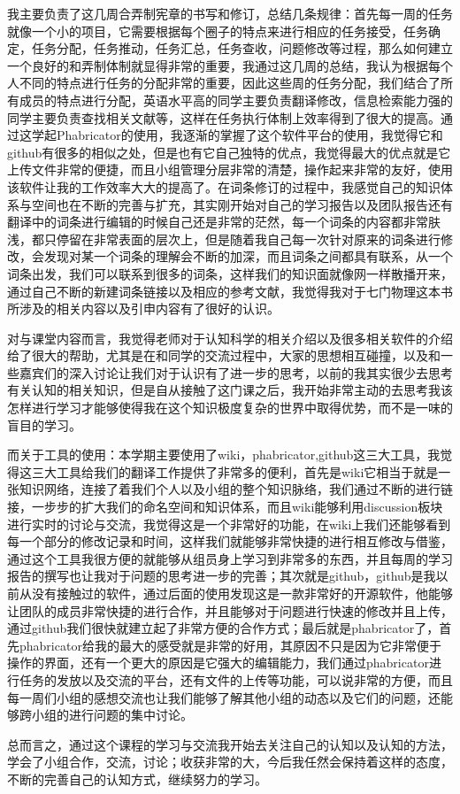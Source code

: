 \documentclass[11pt,fleqn]{book}
\numberwithin{dummy}{section}
\theoremstyle{ocrenumbox}
\theoremstyle{blacknumex}
\theoremstyle{blacknumbox}
\theoremstyle{ocrenum}
\newenvironment{remark}[1]{\par\vspace{10pt}\small %
	\begin{list}{}{
			\leftmargin=35pt %
			\rightmargin=25pt}\item\ignorespaces %
		\makebox[-2.5pt]{\begin{tikzpicture}[overlay]
			\node[draw=ocre!60,line width=1pt,circle,fill=ocre!25,font=\sffamily\bfseries,inner sep=2pt,outer sep=0pt] at (-15pt,0pt){\textcolor{ocre}{#1}};\end{tikzpicture}} %
		\advance\baselineskip -1pt}{\end{list}\vskip5pt} %
\newlength\esp
\begin{document}
\begin{remark}{黄}
	我主要负责了这几周合弄制宪章的书写和修订，总结几条规律：首先每一周的任务就像一个小的项目，它需要根据每个圈子的特点来进行相应的任务接受，任务确定，任务分配，任务推动，任务汇总，任务查收，问题修改等过程，那么如何建立一个良好的和弄制体制就显得非常的重要，我通过这几周的总结，我认为根据每个人不同的特点进行任务的分配非常的重要，因此这些周的任务分配，我们结合了所有成员的特点进行分配，英语水平高的同学主要负责翻译修改，信息检索能力强的同学主要负责查找相关文献等，这样在任务执行体制上效率得到了很大的提高。通过这学起Phabricator的使用，我逐渐的掌握了这个软件平台的使用，我觉得它和github有很多的相似之处，但是也有它自己独特的优点，我觉得最大的优点就是它上传文件非常的便捷，而且小组管理分层非常的清楚，操作起来非常的友好，使用该软件让我的工作效率大大的提高了。在词条修订的过程中，我感觉自己的知识体系与空间也在不断的完善与扩充，其实刚开始对自己的学习报告以及团队报告还有翻译中的词条进行编辑的时候自己还是非常的茫然，每一个词条的内容都非常肤浅，都只停留在非常表面的层次上，但是随着我自己每一次针对原来的词条进行修改，会发现对某一个词条的理解会不断的加深，而且词条之间都具有联系，从一个词条出发，我们可以联系到很多的词条，这样我们的知识面就像网一样散播开来，通过自己不断的新建词条链接以及相应的参考文献，我觉得我对于七门物理这本书所涉及的相关内容以及引申内容有了很好的认识。
     
     对与课堂内容而言，我觉得老师对于认知科学的相关介绍以及很多相关软件的介绍给了很大的帮助，尤其是在和同学的交流过程中，大家的思想相互碰撞，以及和一些嘉宾们的深入讨论让我们对于认识有了进一步的思考，以前的我其实很少去思考有关认知的相关知识，但是自从接触了这门课之后，我开始非常主动的去思考我该怎样进行学习才能够使得我在这个知识极度复杂的世界中取得优势，而不是一味的盲目的学习。
     
     而关于工具的使用：本学期主要使用了wiki，phabricator,github这三大工具，我觉得这三大工具给我们的翻译工作提供了非常多的便利，首先是wiki它相当于就是一张知识网络，连接了着我们个人以及小组的整个知识脉络，我们通过不断的进行链接，一步步的扩大我们的命名空间和知识体系，而且wiki能够利用discussion板块进行实时的讨论与交流，我觉得这是一个非常好的功能，在wiki上我们还能够看到每一个部分的修改记录和时间，这样我们就能够非常快捷的进行相互修改与借鉴，通过这个工具我很方便的就能够从组员身上学习到非常多的东西，并且每周的学习报告的撰写也让我对于问题的思考进一步的完善；其次就是github，github是我以前从没有接触过的软件，通过后面的使用发现这是一款非常好的开源软件，他能够让团队的成员非常快捷的进行合作，并且能够对于问题进行快速的修改并且上传，通过github我们很快就建立起了非常方便的合作方式；最后就是phabricator了，首先phabricator给我的最大的感受就是非常的好用，其原因不只是因为它非常便于操作的界面，还有一个更大的原因是它强大的编辑能力，我们通过phabricator进行任务的发放以及交流的平台，还有文件的上传等功能，可以说非常的方便，而且每一周们小组的感想交流也让我们能够了解其他小组的动态以及它们的问题，还能够跨小组的进行问题的集中讨论。

    总而言之，通过这个课程的学习与交流我开始去关注自己的认知以及认知的方法，学会了小组合作，交流，讨论；收获非常的大，今后我任然会保持着这样的态度，不断的完善自己的认知方式，继续努力的学习。
    
\end{remark}
\end{document}
